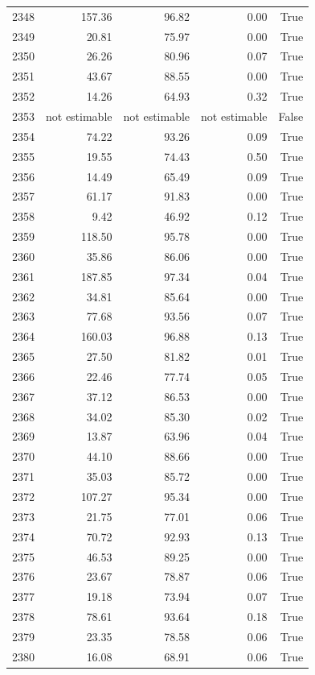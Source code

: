 \begin{longtable}{rrrrr}
2348 & 157.36 & 96.82 & 0.00 & True \\
2349 & 20.81 & 75.97 & 0.00 & True \\
2350 & 26.26 & 80.96 & 0.07 & True \\
2351 & 43.67 & 88.55 & 0.00 & True \\
2352 & 14.26 & 64.93 & 0.32 & True \\
2353 & not estimable & not estimable & not estimable & False \\
2354 & 74.22 & 93.26 & 0.09 & True \\
2355 & 19.55 & 74.43 & 0.50 & True \\
2356 & 14.49 & 65.49 & 0.09 & True \\
2357 & 61.17 & 91.83 & 0.00 & True \\
2358 & 9.42 & 46.92 & 0.12 & True \\
2359 & 118.50 & 95.78 & 0.00 & True \\
2360 & 35.86 & 86.06 & 0.00 & True \\
2361 & 187.85 & 97.34 & 0.04 & True \\
2362 & 34.81 & 85.64 & 0.00 & True \\
2363 & 77.68 & 93.56 & 0.07 & True \\
2364 & 160.03 & 96.88 & 0.13 & True \\
2365 & 27.50 & 81.82 & 0.01 & True \\
2366 & 22.46 & 77.74 & 0.05 & True \\
2367 & 37.12 & 86.53 & 0.00 & True \\
2368 & 34.02 & 85.30 & 0.02 & True \\
2369 & 13.87 & 63.96 & 0.04 & True \\
2370 & 44.10 & 88.66 & 0.00 & True \\
2371 & 35.03 & 85.72 & 0.00 & True \\
2372 & 107.27 & 95.34 & 0.00 & True \\
2373 & 21.75 & 77.01 & 0.06 & True \\
2374 & 70.72 & 92.93 & 0.13 & True \\
2375 & 46.53 & 89.25 & 0.00 & True \\
2376 & 23.67 & 78.87 & 0.06 & True \\
2377 & 19.18 & 73.94 & 0.07 & True \\
2378 & 78.61 & 93.64 & 0.18 & True \\
2379 & 23.35 & 78.58 & 0.06 & True \\
2380 & 16.08 & 68.91 & 0.06 & True \\

\end{longtable}
